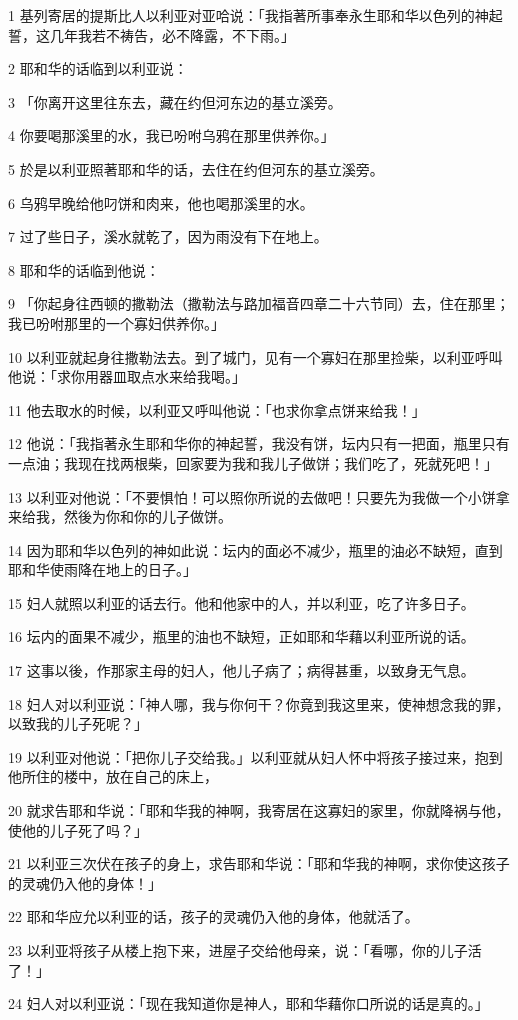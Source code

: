 \par 1 基列寄居的提斯比人以利亚对亚哈说：「我指著所事奉永生耶和华以色列的神起誓，这几年我若不祷告，必不降露，不下雨。」
\par 2 耶和华的话临到以利亚说：
\par 3 「你离开这里往东去，藏在约但河东边的基立溪旁。
\par 4 你要喝那溪里的水，我已吩咐乌鸦在那里供养你。」
\par 5 於是以利亚照著耶和华的话，去住在约但河东的基立溪旁。
\par 6 乌鸦早晚给他叼饼和肉来，他也喝那溪里的水。
\par 7 过了些日子，溪水就乾了，因为雨没有下在地上。
\par 8 耶和华的话临到他说：
\par 9 「你起身往西顿的撒勒法（撒勒法与路加福音四章二十六节同）去，住在那里；我已吩咐那里的一个寡妇供养你。」
\par 10 以利亚就起身往撒勒法去。到了城门，见有一个寡妇在那里捡柴，以利亚呼叫他说：「求你用器皿取点水来给我喝。」
\par 11 他去取水的时候，以利亚又呼叫他说：「也求你拿点饼来给我！」
\par 12 他说：「我指著永生耶和华你的神起誓，我没有饼，坛内只有一把面，瓶里只有一点油；我现在找两根柴，回家要为我和我儿子做饼；我们吃了，死就死吧！」
\par 13 以利亚对他说：「不要惧怕！可以照你所说的去做吧！只要先为我做一个小饼拿来给我，然後为你和你的儿子做饼。
\par 14 因为耶和华以色列的神如此说：坛内的面必不减少，瓶里的油必不缺短，直到耶和华使雨降在地上的日子。」
\par 15 妇人就照以利亚的话去行。他和他家中的人，并以利亚，吃了许多日子。
\par 16 坛内的面果不减少，瓶里的油也不缺短，正如耶和华藉以利亚所说的话。
\par 17 这事以後，作那家主母的妇人，他儿子病了；病得甚重，以致身无气息。
\par 18 妇人对以利亚说：「神人哪，我与你何干？你竟到我这里来，使神想念我的罪，以致我的儿子死呢？」
\par 19 以利亚对他说：「把你儿子交给我。」以利亚就从妇人怀中将孩子接过来，抱到他所住的楼中，放在自己的床上，
\par 20 就求告耶和华说：「耶和华我的神啊，我寄居在这寡妇的家里，你就降祸与他，使他的儿子死了吗？」
\par 21 以利亚三次伏在孩子的身上，求告耶和华说：「耶和华我的神啊，求你使这孩子的灵魂仍入他的身体！」
\par 22 耶和华应允以利亚的话，孩子的灵魂仍入他的身体，他就活了。
\par 23 以利亚将孩子从楼上抱下来，进屋子交给他母亲，说：「看哪，你的儿子活了！」
\par 24 妇人对以利亚说：「现在我知道你是神人，耶和华藉你口所说的话是真的。」

